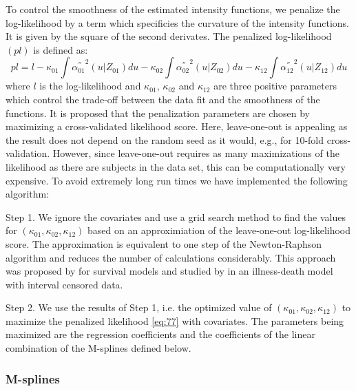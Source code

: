 \documentclass{article}
\begin{document}
To control the smoothness of the estimated intensity functions, we
penalize the log-likelihood by a term which specificies the curvature
of the intensity functions. It is given by the square of the second
derivates. The penalized log-likelihood $(pl)$ is defined as:
\begin{equation}
\label{eq:77}
pl = l - \kappa_{01} \int {\alpha_{01} ^{''} }^2 (u|Z_{01}) du  - \kappa_{02} \int {\alpha_{02} ^{''} }^2 (u|Z_{02}) du
- \kappa_{12} \int {\alpha_{12} 
^{''} }^2 (u|Z_{12}) du
\end{equation}
where $l$ is the log-likelihood and $\kappa_{01}$, $\kappa_{02}$ and
$\kappa_{12}$ are three positive parameters which control the
trade-off between the data fit and the smoothness of the functions. It
is proposed that the penalization parameters are chosen by maximizing
a cross-validated likelihood score. Here, leave-one-out is appealing
as the result does not depend on the random seed as it would, e.g.,
for 10-fold cross-validation.  However, since leave-one-out requires
as many maximizations of the likelihood as there are subjects in the
data set, this can be computationally very expensive. To avoid
extremely long run times we have implemented the following algorithm:

Step 1. We ignore the covariates and use a grid search method to find
 the values for $(\kappa_{01}, \kappa_{02}, \kappa_{12})$ based on an
 approximiation of the leave-one-out log-likelihood score.  The
 approximation is equivalent to one step of the Newton-Raphson
 algorithm and reduces the number of calculations considerably. This
 approach was proposed by \citet{O'Sullivan_1988} for survival models
 and studied by \citet{Joly_Commenges_Helmer_Letenneur_2002} in an
 illness-death model
with interval censored data.

Step 2. We use the results of Step 1, i.e. the optimized value of
  $(\kappa_{01}, \kappa_{02}, \kappa_{12})$ to maximize the penalized
  likelihood \eqref{eq:77} with covariates. The parameters being
  maximized are the regression coefficients and the coefficients of
  the linear combination of the M-splines defined below.
\subsubsection{M-splines}
\label{sec-3-2-2}
\end{document}
